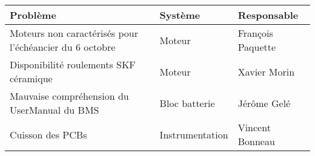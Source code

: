 \begin{tabularx}{\linewidth}{
    |>{\hsize=1.7\hsize}X|%
    >{\hsize=0.5\hsize}X|%
    >{\hsize=0.8\hsize}X|%
  }
    \hline
    \textbf{Problème} & \textbf{Système} & \textbf{Responsable} \\\hline
    Moteurs non caractérisés pour l'échéancier du 6 octobre & Moteur & François Paquette \\\hline
    Disponibilité roulements SKF céramique & Moteur & Xavier Morin\\\hline
    Mauvaise compréhension du UserManual du BMS & Bloc batterie & Jérôme Gelé\\\hline
    Cuisson des PCBs & Instrumentation & Vincent Bonneau\\\hline
\end{tabularx}
    
    
